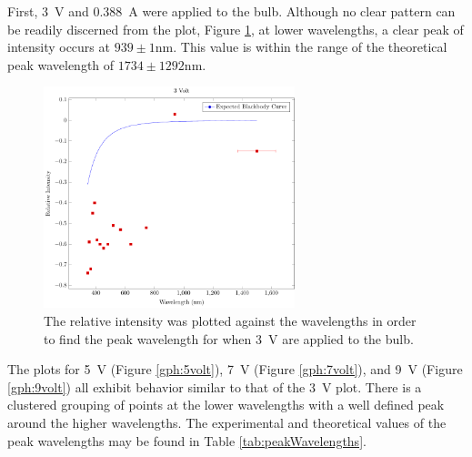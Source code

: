 \documentclass[a4paper]{article}
\begin{document}
\qq First, \SI{3}{\volt} and \SI{0.388}{\ampere} were applied to the
bulb. Although no clear pattern can be readily discerned from the plot, Figure
\ref{gph:3volt}, at lower wavelengths, a clear peak of intensity occurs at
\( 939 \pm 1 \si{\nano\meter} \). This value is within the range of the
theoretical peak wavelength of \( 1734 \pm 1292 \si{\nano\meter} \). 

\begin{figure}[H]
  \begin{center}
    \includegraphics[width=0.65\textwidth]{P6-BlackbodyRadiation/Plots/3Volt/3volt.pdf}
  \end{center}
  \label{gph:3volt}
  \caption{The relative intensity was plotted against the wavelengths in order
    to find the peak wavelength for when \SI{3}{\volt} are applied to the bulb.}
\end{figure}

\qq The plots for \SI{5}{\volt} (Figure \ref{gph:5volt}), \SI{7}{\volt} (Figure
\ref{gph:7volt}), and \SI{9}{\volt} (Figure \ref{gph:9volt}) all exhibit
behavior similar to that of the \SI{3}{\volt} plot. There is a clustered
grouping of points at the lower wavelengths with a well defined peak around the
higher wavelengths. The experimental and theoretical values of the peak
wavelengths may be found in Table \ref{tab:peakWavelengths}. 
\end{document}
